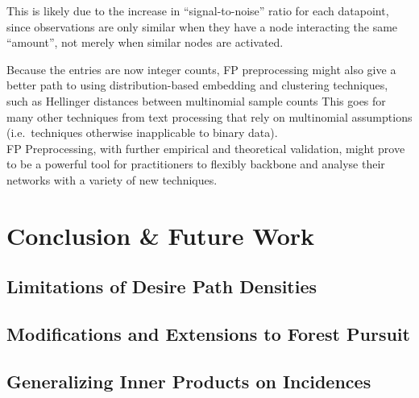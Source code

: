 \documentclass[%
	12pt,
		oneside,
		letterpaper
]{book}
\begin{document}
This is likely due to the increase in ``signal-to-noise'' ratio for each
datapoint, since observations are only similar when they have a node
interacting the same ``amount'', not merely when similar nodes are
activated.

Because the entries are now integer counts, FP preprocessing might also
give a better path to using distribution-based embedding and clustering
techniques, such as Hellinger distances between multinomial sample
counts This goes for many other techniques from text processing that
rely on multinomial assumptions (i.e.~techniques otherwise inapplicable
to binary data).\\
FP Preprocessing, with further empirical and theoretical validation,
might prove to be a powerful tool for practitioners to flexibly backbone
and analyse their networks with a variety of new techniques.

\chapter{Conclusion \& Future Work}\label{conclusion-future-work}

\section{Limitations of Desire Path Densities}\label{sec-issues}

\section{Modifications and Extensions to Forest
Pursuit}\label{sec-future-fp}

\section{Generalizing Inner Products on
Incidences}\label{sec-future-hyperbolic}


\singlespacing
\printbibliography

\doublespacing
\end{document}
